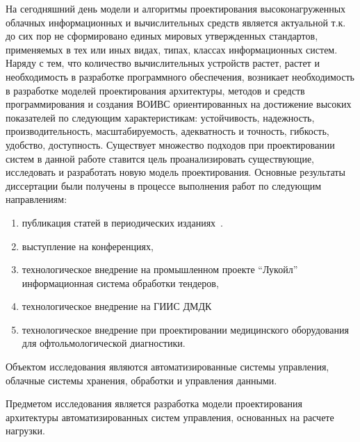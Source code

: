 
{\actuality} 

На сегодняшний день модели и алгоритмы проектирования высоконагруженных облачных информационных и вычислительных средств является актуальной т.к. до сих пор не сформировано единых мировых утвержденных стандартов, применяемых в тех или иных видах, типах, классах информационных систем. 
Наряду с тем, что количество вычислительных устройств растет, растет и необходимость в разработке программного обеспечения, возникает необходимость в разработке моделей проектирования архитектуры, методов и средств программирования и создания ВОИВС ориентированных на достижение высоких показателей по следующим характеристикам: устойчивость, надежность, производительность, масштабируемость, адекватность и точность, гибкость, удобство, доступность.
Существует множество подходов при проектировании систем в данной работе ставится цель проанализировать существующие, исследовать и разработать новую модель проектирования. 
Основные результаты диссертации были получены в процессе выполнения работ по следующим направлениям:
\begin{enumerate}
    \item публикация статей в периодических изданиях~\cite{aaij2022searches, baptista2021angular, leite2021observation,baptista2021searches,collaboration2021measurement,baptista2021measurement,aaij2021precision,aaij2022identification,bediaga2020measurement, aaij2021constraints,   onderwater2020study, aaij2022arxiv,     aaij2019arxiv,aaij2021evidence,aaij2020aps,baptista2021observation,baptista2021search,aaij2020isospin,  aaij2019precision,aaij2019search, lhcb2108evidence,aaij2022study,         aaij2022first,aaij2022j,  aaij2022observation, aaij2022tests}.
    \item выступление на конференциях,
    \item технологическое внедрение на промышленном проекте “Лукойл” информационная система обработки тендеров,
    \item технологическое внедрение на ГИИС ДМДК
    \item технологическое внедрение при проектировании медицинского оборудования для офтольмологической диагностики.
\end{enumerate}

Объектом исследования являются автоматизированные системы управления, облачные системы хранения, обработки и управления данными.

Предметом исследования является разработка модели проектирования архитектуры  автоматизированных систем управления, основанных на расчете нагрузки.

